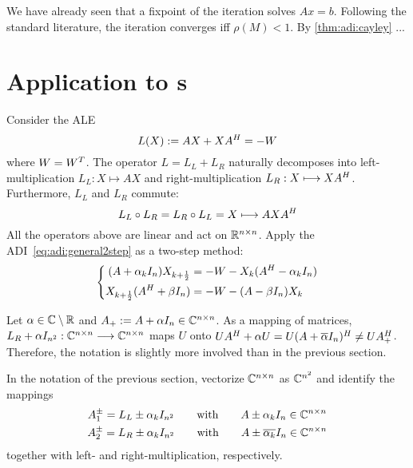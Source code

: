 We have already seen that a fixpoint of the iteration solves $Ax=b$.
Following the standard literature,
the iteration converges iff $\rho(M) < 1$.
By \autoref{thm:adi:cayley} ...



\section{Application to s}
\label{sec:adi:ale}

Consider the \ac{ALE}
\begin{equation*}
\label{eq:adi:ale}
  L(X) := AX + XA^H = -W
\end{equation*}
where $W = W^T$.
The \Lyapunov operator $L = L_L + L_R$ naturally decomposes into
left-multiplication $L_L : X \mapsto AX$ and
right-multiplication $L_R : X \longmapsto XA^H$.
Furthermore, $L_L$ and $L_R$ commute:
\begin{equation*}
  L_L \circ L_R = L_R \circ L_L = X \longmapsto AXA^H
\end{equation*}
All the operators above are linear and act on $\mathbb{R}^{n\times n}$.
Apply the \ac{ADI}~\eqref{eq:adi:general2step} as a two-step method:
\begin{equation}
  \left\{
  \begin{aligned}
    (A + \alpha_k I_n) X_{k+\frac{1}{2}} &= -W - X_k (A^H - \alpha_k I_n) \\
    X_{k+\frac{1}{2}} (A^H + \beta I_n) &= -W - (A - \beta I_n) X_k
  \end{aligned}
  \right.
\end{equation}

\begin{remark}
  Let $\alpha\in\mathbb{C}\setminus\mathbb{R}$ and $A_+ := A+\alpha I_n \in\mathbb{C}^{n\times n}$.
  As a mapping of matrices,
  $L_R + \alpha I_{n^2} : \mathbb{C}^{n\times n} \longrightarrow \mathbb{C}^{n\times n}$ maps $U$ onto
  $
    U A^\HT + \alpha U =
    U(A+\conj{\alpha} I_n)^\HT \neq
    U A_+^\HT
  $.
  Therefore, the notation is slightly more involved than in the previous section.

  In the notation of the previous section,
  vectorize $\mathbb{C}^{n\times n}$ as $\mathbb{C}^{n^2}$ and identify the mappings
  \begin{gather*}
    A_1^\pm = L_L \pm \alpha_k I_{n^2}
    \qquad\text{with}\qquad
    A \pm \alpha_k I_n \in\Cnn \\
    A_2^\pm = L_R \pm \alpha_k I_{n^2}
    \qquad\text{with}\qquad
    A \pm \conj{\alpha_k} I_n \in\Cnn
  \end{gather*}
  together with left- and right-multiplication, respectively.
\end{remark}

